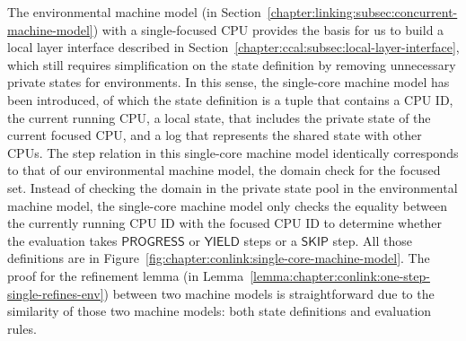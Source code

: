 The environmental machine model 
(in Section~\ref{chapter:linking:subsec:concurrent-machine-model})
 with a single-focused CPU provides the 
basis for us to build a local layer interface described in Section~\ref{chapter:ccal:subsec:local-layer-interface},
which still requires simplification on the state definition by 
removing unnecessary private states for environments. 
In this sense, the single-core machine model has been introduced,
of which the state definition is a tuple that contains 
a CPU ID, the current running CPU, 
a local state, that includes the private state of the current focused CPU,
and a log that represents the shared state with other CPUs. 
The step relation in this single-core machine model identically corresponds to that of our environmental machine model,
the domain check for the focused set. 
Instead of checking the domain in the private state pool in the environmental machine model, 
the single-core machine model only checks the equality between the currently running CPU ID with the focused CPU ID to determine whether the evaluation takes $\textsf{PROGRESS}$ or $\textsf{YIELD}$ steps or a $\textsf{SKIP}$ step. 
All those definitions are in Figure~\ref{fig:chapter:conlink:single-core-machine-model}.
The proof for the refinement lemma (in Lemma~\ref{lemma:chapter:conlink:one-step-single-refines-env}) between two machine models is straightforward due to the similarity of those two machine models: both state definitions and evaluation rules. 

%
%


